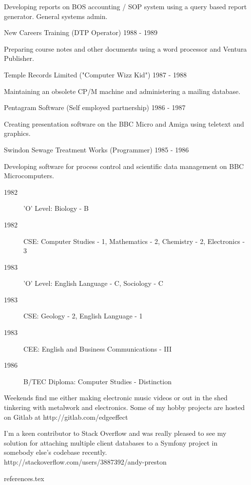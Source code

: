 Developing reports on BOS accounting / SOP system
using a query based report generator. General systems admin.

\jobHeading
    {New Careers Training (DTP Operator)}
    {1988 - 1989}

Preparing course notes and other documents
using a word processor and Ventura Publisher.

\jobHeading
    {Temple Records Limited ("Computer Wizz Kid")}
    {1987 - 1988}

Maintaining an obsolete CP/M machine and administering a mailing database.

\jobHeading
    {Pentagram Software (Self employed partnership)}
    {1986 - 1987}

Creating presentation software on the BBC Micro and Amiga
using teletext and graphics.

\jobHeading
    {Swindon Sewage Treatment Works (Programmer)}
    {1985 - 1986}

Developing software for process control and scientific data management
on BBC Microcomputers.



\begin{description}
    \item[1982] 'O' Level: Biology - B
    \item[1982] CSE: Computer Studies - 1, Mathematics - 2,
        Chemistry - 2, Electronics - 3
    \item[1983] 'O' Level: English Language - C, Sociology - C
    \item[1983] CSE: Geology - 2, English Language - 1
    \item[1983] CEE: English and Business Communications - III
\end{description}


\begin{description}
    \item[1986] B/TEC Diploma: Computer Studies - Distinction
\end{description}


Weekends find me either making electronic music videos
or out in the shed tinkering with metalwork and electronics.
Some of my hobby projects are hosted on Gitlab at
http://gitlab.com/edgeeffect

I'm a keen contributor to Stack Overflow and was really pleased to
see my solution for attaching multiple client databases to a Symfony
project in somebody else's codebase recently.
http://stackoverflow.com/users/3887392/andy-preston


 {references.tex}
